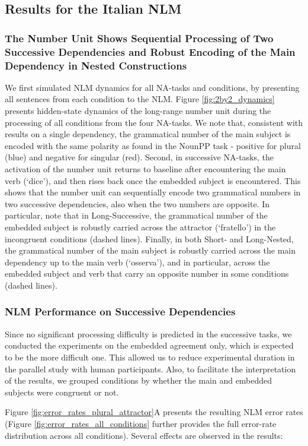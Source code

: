 \subsection{Results for the Italian NLM}\label{results_NLMs}
\subsubsection{The Number Unit Shows Sequential Processing of Two Successive Dependencies and Robust Encoding of the Main Dependency in Nested Constructions}
We first simulated NLM dynamics for all NA-tasks and conditions, by presenting all sentences from each condition to the NLM. Figure \ref{fig:2by2_dynamics} presents hidden-state dynamics of the long-range number unit during the processing of all conditions from the four NA-tasks. We note that, consistent with results on a single dependency, the grammatical number of the main subject is encoded with the same polarity as found in the NounPP task - positive for plural (blue) and negative for singular (red). Second, in successive NA-tasks, the activation of the number unit returns to baseline after encountering the main verb (`dice'), and then rises back once the embedded subject is encountered. This shows that the number unit can sequentially encode two grammatical numbers in two successive dependencies, also when the two numbers are opposite. In particular, note that in Long-Successive, the grammatical number of the embedded subject is robustly carried across the attractor (`fratello') in the incongruent conditions (dashed lines). Finally, in both Short- and Long-Nested, the grammatical number of the main subject is robustly carried across the main dependency up to the main verb (`osserva'), and in particular, across the embedded subject and verb that carry an opposite number in some conditions (dashed lines).

\subsubsection{NLM Performance on Successive Dependencies}
Since no significant processing difficulty is predicted in the successive tasks, we conducted the experiments on the embedded agreement only, which is expected to be the more difficult one. 
This allowed us to reduce experimental duration in the parallel study with human participants. Also, to facilitate the interpretation of the results, we grouped conditions by whether the main and embedded subjects were congruent or not.

Figure \ref{fig:error_rates_plural_attractor}A presents the resulting NLM error rates (Figure \ref{fig:error_rates_all_conditions} further provides the full error-rate distribution across all conditions). Several effects are observed in the results: 

